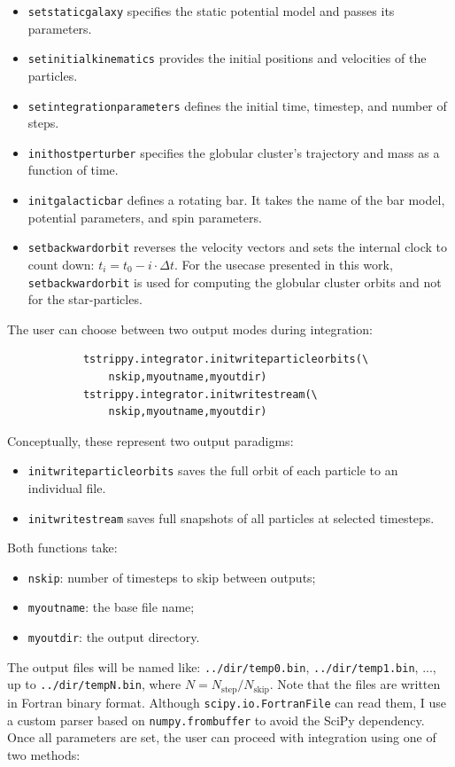         \begin{itemize}
            \item \texttt{setstaticgalaxy} specifies the static potential model and passes its parameters.
            \item \texttt{setinitialkinematics} provides the initial positions and velocities of the particles.
            \item \texttt{setintegrationparameters} defines the initial time, timestep, and number of steps.
            \item \texttt{inithostperturber} specifies the globular cluster's trajectory and mass as a function of time.
            \item \texttt{initgalacticbar} defines a rotating bar. It takes the name of the bar model, potential parameters, and spin parameters.
            \item \texttt{setbackwardorbit} reverses the velocity vectors and sets the internal clock to count down: $t_i = t_0 - i \cdot \Delta t$. For the usecase presented in this work, \texttt{setbackwardorbit} is used for computing the globular cluster orbits and not for the star-particles. 
        \end{itemize}
        The user can choose between two output modes during integration:
        \begin{lstlisting}
            tstrippy.integrator.initwriteparticleorbits(\
                nskip,myoutname,myoutdir)
            tstrippy.integrator.initwritestream(\
                nskip,myoutname,myoutdir)
        \end{lstlisting}
        Conceptually, these represent two output paradigms:
        \begin{itemize}
            \item \texttt{initwriteparticleorbits} saves the full orbit of each particle to an individual file.
            \item \texttt{initwritestream} saves full snapshots of all particles at selected timesteps.
        \end{itemize}
        Both functions take:
        \begin{itemize}
            \item \texttt{nskip}: number of timesteps to skip between outputs;
            \item\texttt{myoutname}: the base file name;
            \item \texttt{myoutdir}: the output directory.
        \end{itemize}
        The output files will be named like: \texttt{../dir/temp0.bin}, \texttt{../dir/temp1.bin}, ..., up to \texttt{../dir/tempN.bin}, where $N = N_\mathrm{step} / N_\mathrm{skip}$. Note that the files are written in Fortran binary format. Although \texttt{scipy.io.FortranFile} can read them, I use a custom parser based on \texttt{numpy.frombuffer} to avoid the SciPy dependency. Once all parameters are set, the user can proceed with integration using one of two methods:
